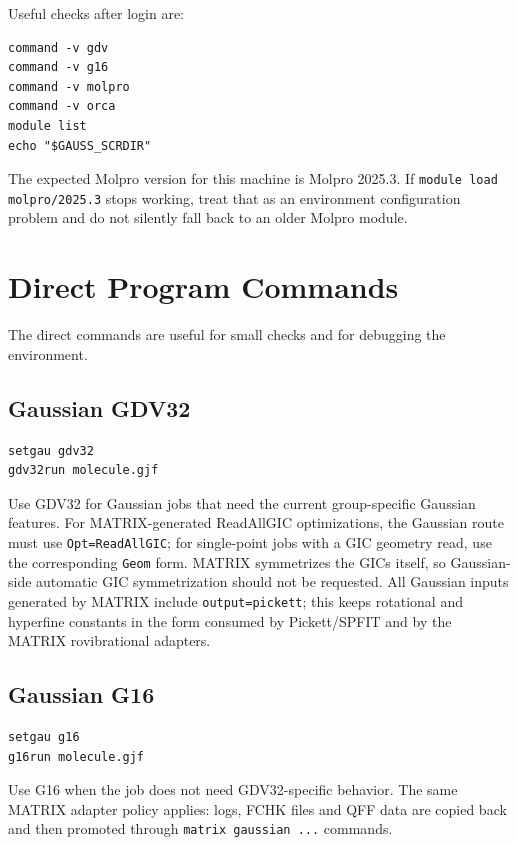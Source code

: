 \documentclass[11pt]{article}
\begin{document}
Useful checks after login are:

\begin{lstlisting}[style=matrix]
command -v gdv
command -v g16
command -v molpro
command -v orca
module list
echo "$GAUSS_SCRDIR"
\end{lstlisting}

The expected Molpro version for this machine is Molpro 2025.3.  If
\texttt{module load molpro/2025.3} stops working, treat that as an environment
configuration problem and do not silently fall back to an older Molpro module.

\section{Direct Program Commands}

The direct commands are useful for small checks and for debugging the
environment.

\subsection{Gaussian GDV32}

\begin{lstlisting}[style=matrix]
setgau gdv32
gdv32run molecule.gjf
\end{lstlisting}

Use GDV32 for Gaussian jobs that need the current group-specific Gaussian
features.  For MATRIX-generated ReadAllGIC optimizations, the Gaussian route
must use \texttt{Opt=ReadAllGIC}; for single-point jobs with a GIC geometry
read, use the corresponding \texttt{Geom} form.  MATRIX symmetrizes the GICs
itself, so Gaussian-side automatic GIC symmetrization should not be requested.
All Gaussian inputs generated by MATRIX include \texttt{output=pickett}; this
keeps rotational and hyperfine constants in the form consumed by Pickett/SPFIT
and by the MATRIX rovibrational adapters.

\subsection{Gaussian G16}

\begin{lstlisting}[style=matrix]
setgau g16
g16run molecule.gjf
\end{lstlisting}

Use G16 when the job does not need GDV32-specific behavior.  The same MATRIX
adapter policy applies: logs, FCHK files and QFF data are copied back and then
promoted through \texttt{matrix gaussian ...} commands.
\end{document}
